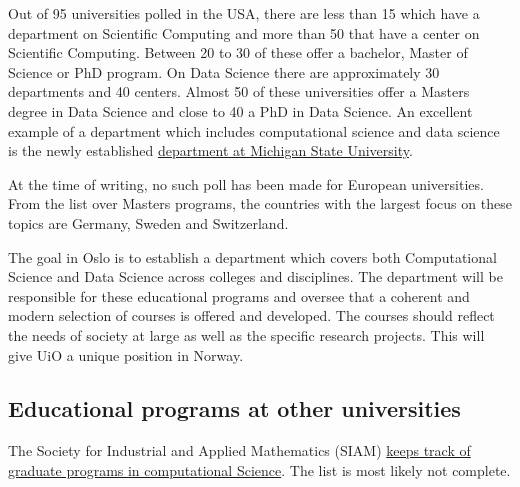 \documentclass[%
oneside,                 %
final,                   %
10pt]{article}
\begin{document}
\noindent
Out of 95 universities polled in the USA, there are less than 15 which have a department on Scientific Computing
and more than 50 that have a center on Scientific Computing. Between 20 to 30 of these offer a bachelor, Master of Science or PhD program. On Data Science there are approximately 30 departments and 40 centers. Almost 50 of these universities offer a Masters degree in Data Science and close to 40 a PhD in Data Science. 
An excellent example of a department which includes computational science and data science is the newly established \href{{https://cmse.msu.edu/}}{department at Michigan State University}.

At the time of writing, no such poll has been made for European universities. From the list over Masters programs, the countries with the largest focus on these topics are Germany, Sweden and Switzerland. 

The goal in Oslo is to establish a department which covers both Computational Science and Data Science across colleges and disciplines. The department will be responsible for these educational programs and oversee that a coherent and modern selection of courses is offered and developed. The courses should reflect the needs of society at large as well as the specific research projects.  This will give UiO a unique position in Norway. 


\subsection{Educational programs at  other universities}

The Society for Industrial and Applied Mathematics (SIAM) \href{{https://www.siam.org/students/resources/cse_programs.php}}{keeps track of graduate programs in computational Science}. The list is most likely not complete. 




\end{document}

